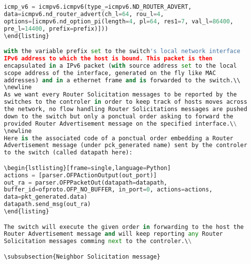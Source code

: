 \documentclass{article}
\begin{document}
\begin{lstlisting}[frame=single,language=Python] 
icmp_v6 = icmpv6.icmpv6(type_=icmpv6.ND_ROUTER_ADVERT,
data=icmpv6.nd_router_advert(ch_l=64, rou_l=4,
options=[icmpv6.nd_option_pi(length=4, pl=64, res1=7, val_l=86400,
pre_l=14400, prefix=prefix)]))
\end{listing}

with the variable prefix set to the switch's local network interface
IPv6 address to which the host is bound. This packet is then
encapsulated in a IPv6 packet (with source address set to the local
scope address of the interface, generated on the fly like MAC
addresses) and in a ethernet frame and is forwarded to the switch.\\ 
\newline
As we want every Router Solicitation messages to be reported by the
switches to the controler in order to keep track of hosts moves across
the network, no flow handling Router Solicitations messages are pushed
down to the switch but only a ponctual order asking to forward the
provided Router Advertisement message on the specified interface.\\
\newline
Here is the associated code of a ponctual order embedding a Router
Advertisement message (under pck_generated name) sent by the controler
to the switch (called datapath here):

\begin{lstlisting}[frame=single,language=Python] 
actions = [parser.OFPActionOutput(out_port)] 
out_ra = parser.OFPPacketOut(datapath=datapath,
buffer_id=ofproto.OFP_NO_BUFFER, in_port=0, actions=actions,
data=pkt_generated.data) 
datapath.send_msg(out_ra)
\end{listing}

The switch will execute the given order in forwarding to the host the
Router Advertisement message and will keep reporting any Router
Solicitation messages comming next to the controler.\\

\subsubsection{Neighbor Solicitation message}


\end{lstlisting}
\end{document}
